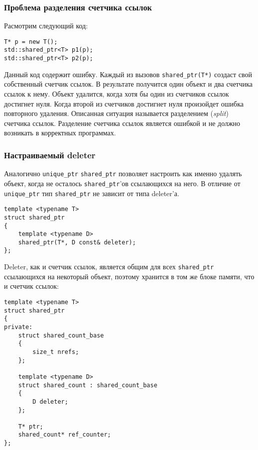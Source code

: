 \subsubsection{Проблема разделения счетчика ссылок}

Расмотрим следующий код:
\begin{verbatim}
T* p = new T();
std::shared_ptr<T> p1(p);
std::shared_ptr<T> p2(p);
\end{verbatim}
Данный код содержит ошибку. Каждый из вызовов \texttt{shared_ptr(T*)} создаст свой собственный счетчик ссылок. В результате получится один объект и два счетчика ссылок к нему. Объект удалится, когда хотя бы один из счетчиков ссылок достигнет нуля. Когда второй из счетчиков достигнет нуля произойдет ошибка повторного удаления. Описанная ситуация называется разделением ({\it split}) счетчика ссылок. Разделение счетчика ссылок является ошибкой и не должно возникать в корректных программах.

\subsubsection{Настраиваемый deleter}

Аналогично \texttt{unique_ptr} \texttt{shared_ptr} позволяет настроить как именно удалять объект, когда не осталось \texttt{shared_ptr}'ов ссылающихся на него. В отличие от \texttt{unique_ptr} тип \texttt{shared_ptr} не зависит от типа deleter'а.

\begin{verbatim}
template <typename T>
struct shared_ptr
{
    template <typename D>
    shared_ptr(T*, D const& deleter);
};
\end{verbatim}

Deleter, как и счетчик ссылок, является общим для всех \texttt{shared_ptr} ссылающихся на некоторый объект, поэтому хранится в том же блоке памяти, что и счетчик ссылок:

\begin{verbatim}
template <typename T>
struct shared_ptr
{
private:
    struct shared_count_base
    {
        size_t nrefs;
    };
    
    template <typename D>
    struct shared_count : shared_count_base
    {
        D deleter;
    };
    
    T* ptr;
    shared_count* ref_counter;
};
\end{verbatim}

